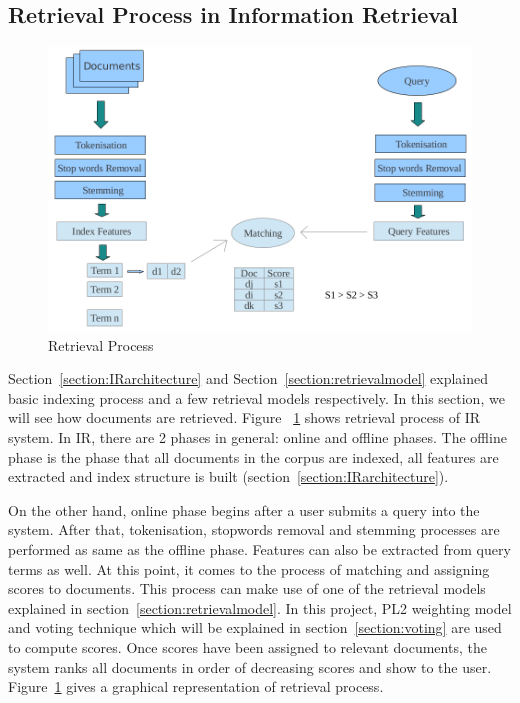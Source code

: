 \subsection{Retrieval Process in Information Retrieval}\label{section:retrieving}
\begin{figure}
\centering
\includegraphics[scale=0.3]{./figures/retrieval.png}
\caption{Retrieval Process} \label{fig:retrieval} 
\end{figure}
Section~\ref{section:IRarchitecture} and Section~\ref{section:retrievalmodel} explained basic indexing process and a few retrieval models respectively.
In this section, we will see how documents are retrieved. Figure ~\ref{fig:retrieval} shows
retrieval process of IR system. In IR, there are 2 phases in general:
online and offline phases. The offline phase is the phase that all documents in the corpus are indexed, all features are extracted 
and index structure is built (section~\ref{section:IRarchitecture}). 


On the other hand, online phase begins after a user submits a query into the system. After that, tokenisation, stopwords removal and stemming processes 
are performed as same as the offline phase.
Features can also be extracted from query terms as well. At this point, it comes to the process of matching and assigning scores to documents.
This process can make use of one of the retrieval models explained in section~\ref{section:retrievalmodel}. In this project, PL2 weighting model and voting
technique which will be explained in section~\ref{section:voting} are used to compute scores.
Once scores have been assigned to relevant documents, the system ranks all documents in order of decreasing scores and 
show to the user. Figure~\ref{fig:retrieval} gives a graphical representation of retrieval process.

